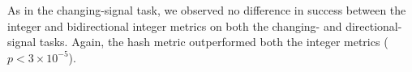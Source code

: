 As in the changing-signal task, we observed no difference in success between the integer and bidirectional integer metrics on both the changing- and directional-signal tasks.
Again, the hash metric outperformed both the integer metrics ($p < 3\times10^{-5}$).



